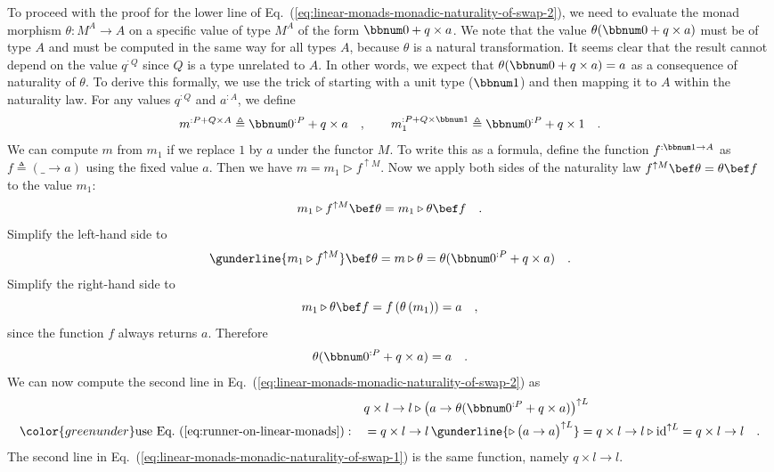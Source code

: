 To proceed with the proof for the lower line of Eq.~(\ref{eq:linear-monads-monadic-naturality-of-swap-2}),
we need to evaluate the monad morphism $\theta:M^{A}\rightarrow A$
on a specific value of type $M^{A}$ of the form $\bbnum 0+q\times a$.
We note that the value $\theta(\bbnum 0+q\times a)$ must be of type
$A$ and must be computed in the same way for all types $A$, because
$\theta$ is a natural transformation. It seems clear that the result
cannot depend on the value $q^{:Q}$ since $Q$ is a type unrelated
to $A$. In other words, we expect that $\theta(\bbnum 0+q\times a)=a$
as a consequence of naturality of $\theta$. To derive this formally,
we use the trick of starting with a unit type ($\bbnum 1$) and then
mapping it to $A$ within the naturality law. For any values $q^{:Q}$
and $a^{:A}$, we define 
\[
m^{:P+Q\times A}\triangleq\bbnum 0^{:P}+q\times a\quad,\quad\quad m_{1}^{:P+Q\times\bbnum 1}\triangleq\bbnum 0^{:P}+q\times1\quad.
\]
We can compute $m$ from $m_{1}$ if we replace $1$ by $a$ under
the functor $M$. To write this as a formula, define the function
$f^{:\bbnum 1\rightarrow A}$ as $f\triangleq\left(\_\rightarrow a\right)$
using the fixed value $a$. Then we have $m=m_{1}\triangleright f^{\uparrow M}$.
Now we apply both sides of the naturality law $f^{\uparrow M}\bef\theta=\theta\bef f$
to the value $m_{1}$:
\[
m_{1}\triangleright f^{\uparrow M}\bef\theta=m_{1}\triangleright\theta\bef f\quad.
\]
Simplify the left-hand side to
\[
\gunderline{m_{1}\triangleright f^{\uparrow M}}\bef\theta=m\triangleright\theta=\theta(\bbnum 0^{:P}+q\times a)\quad.
\]
Simplify the right-hand side to 
\[
m_{1}\triangleright\theta\bef f=f\left(\theta\left(m_{1}\right)\right)=a\quad,
\]
since the function $f$ always returns $a$. Therefore 
\begin{equation}
\theta(\bbnum 0^{:P}+q\times a)=a\quad.\label{eq:runner-on-linear-monads}
\end{equation}
We can now compute the second line in Eq.~(\ref{eq:linear-monads-monadic-naturality-of-swap-2})
as
\begin{align*}
 & q\times l\rightarrow l\triangleright\big(a\rightarrow\theta(\bbnum 0^{:P}+q\times a)\big)^{\uparrow L}\\
{\color{greenunder}\text{use Eq.~(\ref{eq:runner-on-linear-monads})}:}\quad & =q\times l\rightarrow l\,\gunderline{\triangleright\,\big(a\rightarrow a\big)^{\uparrow L}}=q\times l\rightarrow l\triangleright\text{id}^{\uparrow L}=q\times l\rightarrow l\quad.
\end{align*}
The second line in Eq.~(\ref{eq:linear-monads-monadic-naturality-of-swap-1})
is the same function, namely $q\times l\rightarrow l$.


